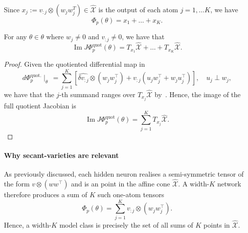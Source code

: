 \noindent
Since $x_{j}:= v_{:j} \otimes (w_{j}w_{j}^T) \in \widehat{\mathcal{X}}$ is the output of each atom $j=1, \dots K$, we have
\begin{equation}
    \Phi_{p}(\theta) = x_{1} + \dots + x_{K}.
\end{equation}

\begin{proposition}
    For any $\theta \in \theta$ where $w_{j} \not = 0$ and $v_{:j} \not = 0$, we have that
    \begin{equation}
        \operatorname{Im} J \Phi_{p}^{\operatorname{quot}}(\theta) = T_{x_{1}}\widehat{\mathcal X} + \dots + T_{x_{K}}\widehat{\mathcal X}.
    \end{equation}
\end{proposition}

\begin{proof}
    Given the quotiented differential map in~
    \begin{equation*}
    d \Phi_{p}^{\operatorname{quot.}}\mid_{\theta} \, = \sum_{j=1}^{K} \left[ \widehat{\delta v_{:j}} \otimes (w_{j}w_{j}^{\top}) + v_{:j}\left( u_{j} w_{j}^{\top} + w_{j} u_{j}^{\top} \right) \right], \quad u_{j} \perp w_{j},        
    \end{equation*}
    we have that the $j$-th summand ranges over $T_{x_{j}}\widehat{\mathcal X}$ by~.
    Hence, the image of the full quotient Jacobian is
    \begin{equation}
        \operatorname{Im} J \Phi_{p}^{\textrm{quot}}(\theta)=\sum_{j=1}^{K} T_{x_{j}}\widehat{\mathcal X}.
    \end{equation}
\end{proof}

\paragraph{Why secant-varieties are relevant}
As previously discussed, each hidden neuron realises a semi-symmetric tensor of the form $v \otimes (ww^{\top})$ and is an point in the affine cone $\widehat{\mathcal X}$.
A width-$K$ network therefore produces a sum of $K$ such one-atom tensors
\begin{equation*}
    \Phi_{p}(\theta) = \sum_{j=1}^{K} v_{:j} \otimes (w_{j} w_{j}^{\top}).
\end{equation*}
Hence, a width-$K$ model class is precisely the set of all sums of $K$ points in $\widehat{\mathcal X}$.

